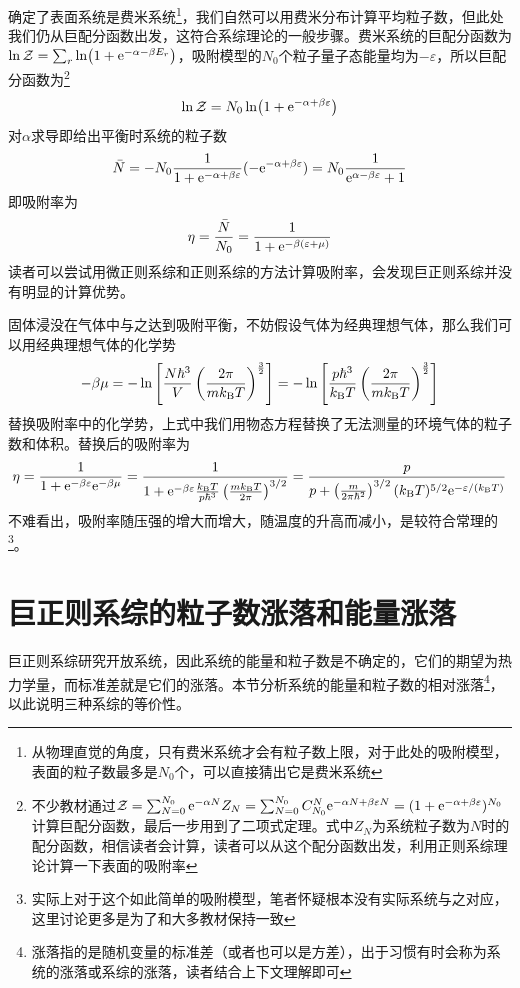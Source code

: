 \documentclass[../../main.tex]{subfiles}
\begin{document}
确定了表面系统是费米系统\footnote{从物理直觉的角度，只有费米系统才会有粒子数上限，对于此处的吸附模型，表面的粒子数最多是\(N_0\)个，可以直接猜出它是费米系统}，我们自然可以用费米分布计算平均粒子数，但此处我们仍从巨配分函数出发，这符合系综理论的一般步骤。费米系统的巨配分函数为\(\ln\mathcal{Z}=\sum_r\ln(1+\mathrm{e}^{-\alpha-\beta E_{r}})\)，吸附模型的\(N_0\)个粒子量子态能量均为\(-\varepsilon\)，所以巨配分函数为\footnote{不少教材通过\(\mathcal{Z}=\sum_{N=0}^{N_0}\mathrm{e}^{-\alpha N}Z_N=\sum_{N=0}^{N_0}C_{N_0}^N\mathrm{e}^{-\alpha N+\beta\varepsilon N}=(1+\mathrm{e}^{-\alpha+\beta\varepsilon})^{N_0}\)计算巨配分函数，最后一步用到了二项式定理。式中\(Z_N\)为系统粒子数为\(N\)时的配分函数，相信读者会计算，读者可以从这个配分函数出发，利用正则系综理论计算一下表面的吸附率}
\begin{equation}
    \ln\mathcal{Z}=N_0\ln(1+\mathrm{e}^{-\alpha+\beta\varepsilon})
\end{equation}
对\(\alpha\)求导即给出平衡时系统的粒子数
\begin{equation}
    \bar{N}=-N_0\frac{1}{1+\mathrm{e}^{-\alpha+\beta\varepsilon}}(-\mathrm{e}^{-\alpha+\beta\varepsilon})=N_0\frac{1}{\mathrm{e}^{\alpha-\beta\varepsilon}+1}
\end{equation}
即吸附率为
\begin{equation}
    \eta=\frac{\bar{N}}{N_0}=\frac{1}{1+\mathrm{e}^{-\beta(\varepsilon+\mu)}}
\end{equation}
读者可以尝试用微正则系综和正则系综的方法计算吸附率，会发现巨正则系综并没有明显的计算优势。

固体浸没在气体中与之达到吸附平衡，不妨假设气体为经典理想气体，那么我们可以用经典理想气体的化学势
\begin{equation}
    -\beta\mu=-\ln\left[\frac{N\hbar^3}{V}\left(\frac{2\pi}{mk_{\mathrm{B}} T}\right)^{\frac{3}{2}}\right]=-\ln\left[\frac{p\hbar^3}{k_{\mathrm{B}} T}\left(\frac{2\pi}{mk_{\mathrm{B}} T}\right)^{\frac{3}{2}}\right]
\end{equation}
替换吸附率中的化学势，上式中我们用物态方程替换了无法测量的环境气体的粒子数和体积。替换后的吸附率为
\begin{equation}
    \eta=\frac{1}{1+\mathrm{e}^{-\beta\varepsilon}\mathrm{e}^{-\beta\mu}}=\frac{1}{1+\mathrm{e}^{-\beta\varepsilon}\frac{k_{\mathrm{B}} T}{p\hbar^3}\left(\frac{mk_{\mathrm{B}} T}{2\pi}\right)^{3/2}}=\frac{p}{p+\left(\frac{m}{2\pi\hbar^2}\right)^{3/2}(k_{\mathrm{B}} T)^{5/2}\mathrm{e}^{-\varepsilon/(k_{\mathrm{B}} T)}}
\end{equation}
不难看出，吸附率随压强的增大而增大，随温度的升高而减小，是较符合常理的\footnote{实际上对于这个如此简单的吸附模型，笔者怀疑根本没有实际系统与之对应，这里讨论更多是为了和大多教材保持一致}。

\section{巨正则系综的粒子数涨落和能量涨落}
巨正则系综研究开放系统，因此系统的能量和粒子数是不确定的，它们的期望为热力学量，而标准差就是它们的涨落。本节分析系统的能量和粒子数的相对涨落\footnote{涨落指的是随机变量的标准差（或者也可以是方差），出于习惯有时会称为系统的涨落或系综的涨落，读者结合上下文理解即可}，以此说明三种系综的等价性。
\end{document}
